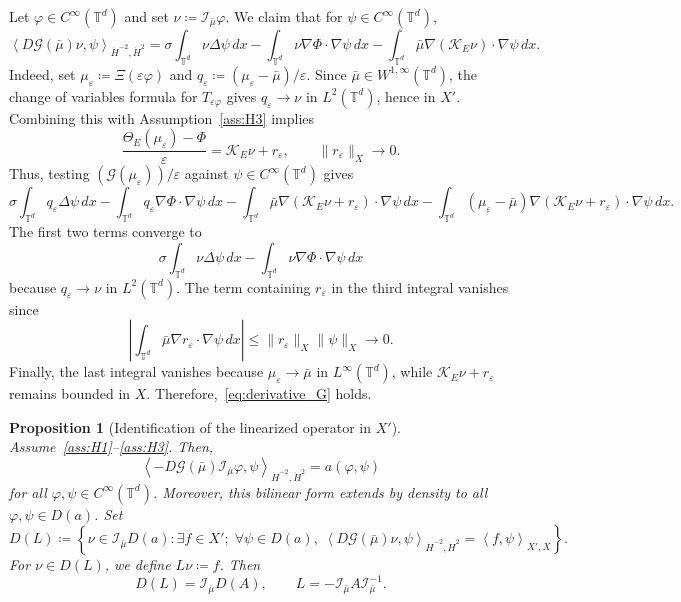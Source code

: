 \documentclass[11pt]{article}
\numberwithin{equation}{section}
\newtheorem{proposition}[theorem]{Proposition}
\theoremstyle{definition}
\newcommand{\T}{\mathbb{T}}
\newcommand{\rieszmap}[1][\mu]{\mathcal{I}_{#1}}
\newcommand{\dotHk}[1][k]{\dot{H}^{#1}}
\begin{document}
Let $\varphi \in C^\infty(\T^d)$ and set $\nu \coloneqq \rieszmap[\bar\mu]\varphi$.
We claim that for $\psi \in C^{\infty}(\T^d)$,
\begin{equation}
    \label{eq:derivative_G}
    \left\langle D \mathcal{G}(\bar\mu) \nu, \psi\right\rangle_{\dot{H}^{-2}, \dotHk[2]} = \sigma\int_{\T^d}\nu \Delta \psi \, dx - \int_{\T^d} \nu \nabla\Phi \cdot \nabla\psi \, dx - \int_{\T^d} \bar\mu  \nabla(\mathcal{K}_E \nu) \cdot \nabla\psi \, dx.
\end{equation}
Indeed, set $\mu_\varepsilon \coloneqq \Xi(\varepsilon\varphi)$ and $q_\varepsilon \coloneqq (\mu_\varepsilon - \bar\mu)/\varepsilon$.
Since $\bar\mu \in W^{1, \infty}(\T^d)$, the change of variables formula for $T_{\varepsilon\varphi}$ gives $q_\varepsilon \to \nu$ in $L^2(\T^d)$, hence in $X'$.
Combining this with Assumption~\ref{ass:H3} implies
\[
\frac{\Theta_E(\mu_\varepsilon)-\Phi}{\varepsilon} = \mathcal{K}_E\nu + r_\varepsilon, \qquad \|r_\varepsilon\|_X \to 0.
\]
Thus, testing $(\mathcal{G}(\mu_\varepsilon)) / \varepsilon$ against $\psi \in C^{\infty}(\T^d)$ gives
\[
\sigma\int_{\T^d} q_\varepsilon \Delta\psi \, dx - \int_{\T^d}q_\varepsilon \nabla\Phi \cdot \nabla\psi \, dx - \int_{\T^d} \bar\mu \nabla(\mathcal{K}_E\nu + r_\varepsilon) \cdot \nabla\psi \, dx -\int_{\T^d}(\mu_\varepsilon-\bar\mu) \nabla(\mathcal{K}_E\nu + r_\varepsilon)\cdot \nabla\psi \, dx.
\]
The first two terms converge to
\[
\sigma \int_{\T^d} \nu \Delta\psi \, dx - \int_{\T^d} \nu \nabla\Phi \cdot \nabla\psi \, dx
\]
because $q_\varepsilon \to \nu$ in $L^2(\T^d)$. 
The term containing $r_\varepsilon$ in the third integral vanishes since
\[
\left|\int_{\T^d} \bar\mu\nabla r_\varepsilon \cdot \nabla\psi \,dx \right| \le \|r_\varepsilon\|_X \|\psi\|_X \to 0.
\]
Finally, the last integral vanishes because $\mu_\varepsilon \to \bar\mu$ in $L^\infty(\T^d)$, while $\mathcal{K}_E\nu + r_\varepsilon$ remains bounded in $X$.
Therefore,~\eqref{eq:derivative_G} holds.

\begin{proposition}[Identification of the linearized operator in $X'$]
    \label{prop:linearized_operator_identification}
    Assume~\ref{ass:H1}--\ref{ass:H3}. 
    Then,
    \[
    \left\langle -D\mathcal{G}(\bar\mu)\rieszmap[\bar\mu]\varphi,\psi\right\rangle_{\dot{H}^{-2}, \dotHk[2]} = a(\varphi, \psi)
    \]
    for all $\varphi, \psi\in C^\infty(\T^d)$.
    Moreover, this bilinear form extends by density to all $\varphi, \psi \in D(a)$.
    Set
    \[
    D(L) \coloneqq \left\{\nu \in \rieszmap[\bar\mu]D(a) : \exists f \in X'; \; \forall \psi \in D(a), \; \left\langle D\mathcal{G}(\bar\mu)\nu, \psi\right\rangle_{\dot{H}^{-2}, \dotHk[2]} = \left\langle f,\psi\right\rangle_{X',X} \right\}.
    \]
    For $\nu \in D(L)$, we define $L\nu \coloneqq f$.
    Then
    \[
    D(L) = \rieszmap[\bar\mu]D(A), \qquad L = -\rieszmap[\bar\mu]A\rieszmap[\bar\mu]^{-1}.
    \]
\end{proposition}
\end{document}
